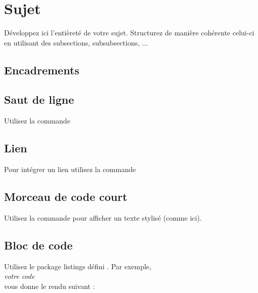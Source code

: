 \section{Sujet}
Développez ici l'entièreté de votre sujet.
Structurez de manière cohérente celui-ci en utilisant des subsections, subsubsections, ...

\subsection{Encadrements}




\subsection{Saut de ligne}

Utilisez la commande 

\subsection{Lien}
Pour intégrer un lien utilisez la commande

\subsection{Morceau de code court}

Utilisez la commande  pour afficher un texte stylisé (comme ici).

\subsection{Bloc de code}

Utilisez le package listings défini .
Par exemple,\\
 \hspace{6pt}
\textit{votre code} \hspace{6pt}
\\
vous donne le rendu suivant :

